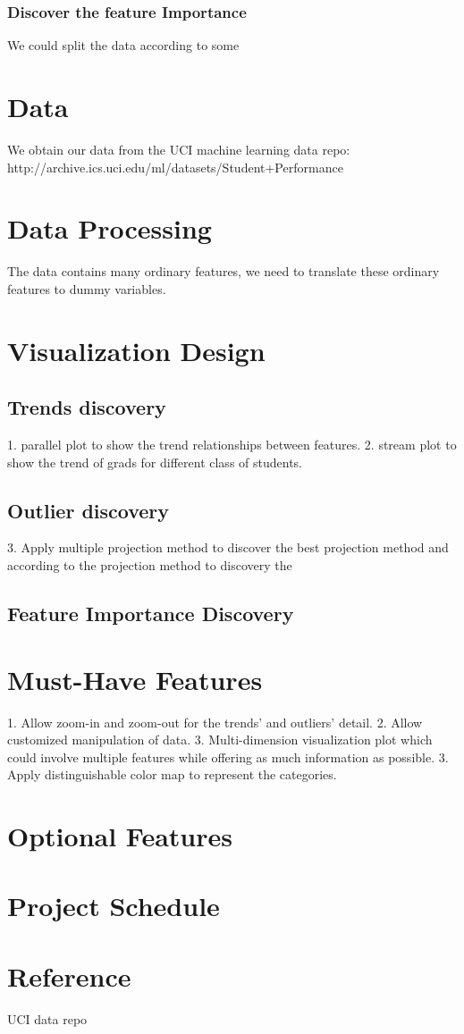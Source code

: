 \documentclass{article}
\begin{document}
\subsubsection{Discover the feature Importance}
We could split the data according to some 
\section{Data}
We obtain our data from the UCI machine learning data repo: \\
http://archive.ics.uci.edu/ml/datasets/Student+Performance
\section{Data Processing}
The data contains many ordinary features, we need to translate these ordinary features to dummy variables.
\section{Visualization Design}
\subsection{Trends discovery}
1. parallel plot to show the trend relationships between features. 
2. stream plot to show the trend of grads for different class of students.
\subsection{Outlier discovery}
3. Apply multiple projection method to discover the best projection method and according to the projection method to discovery the 
\subsection{Feature Importance Discovery}
\section{Must-Have Features}
1. Allow zoom-in and zoom-out for the trends' and outliers' detail.
2. Allow customized manipulation of data.
3. Multi-dimension visualization plot which could involve multiple features while offering as much information as possible. 
3. Apply distinguishable color map to represent the categories.
\section{Optional Features}
\section{Project Schedule}
\section{Reference}
UCI data repo
\end{document}
